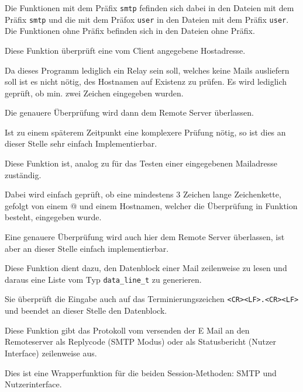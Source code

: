 Die Funktionen mit dem Pr\"{a}fix \texttt{smtp} fefinden sich dabei in den Dateien mit dem Pr\"{a}fix \texttt{smtp} und die mit dem Pr\"{a}fox \texttt{user} in den Dateien mit dem Pr\"{a}fix \texttt{user}.
Die Funktionen ohne Pr\"{a}fix befinden sich in den Dateien ohne Pr\"{a}fix.

\label{fn:check_addr}
Diese Funktion \"{u}berpr\"{u}ft eine vom Client angegebene Hostadresse. 

Da dieses Programm lediglich ein Relay sein soll, welches keine Mails ausliefern soll ist es nicht n\"{o}tig, des Hostnamen auf Existenz zu pr\"{u}fen. Es wird lediglich gepr\"{u}ft, ob min. zwei Zeichen eingegeben wurden. 

Die genauere \"{U}berpr\"{u}fung wird dann dem Remote Server \"{u}berlassen.

Ist zu einem sp\"{a}terem Zeitpunkt eine komplexere Pr\"{u}fung n\"{o}tig, so ist dies an dieser Stelle sehr einfach Implementierbar.

\label{fn:check_mail}
Diese Funktion ist, analog zu  f\"{u}r das Testen einer eingegebenen Mailadresse zust\"{a}ndig. 

Dabei wird einfach gepr\"{u}ft, ob eine mindestens 3 Zeichen lange Zeichenkette, gefolgt von einem @ und einem Hostnamen, welcher die \"{U}berpr\"{u}fung in Funktion  besteht, eingegeben wurde.

Eine genauere \"{U}berpr\"{u}fung wird auch hier dem Remote Server \"{u}berlassen, ist aber an dieser Stelle einfach implementierbar.

\label{fn:read_data}
Diese Funktion dient dazu, den Datenblock einer Mail zeilenweise zu lesen und daraus eine Liste vom Typ \texttt{data\_line\_t} zu generieren.

Sie \"{u}berpr\"{u}ft die Eingabe auch auf das Terminierungszeichen \texttt{<CR><LF>.<CR><LF>} und beendet an dieser Stelle den Datenblock.

\label{fn:put_forward_proto}
Diese Funktion gibt das Protokoll vom versenden der E Mail an den Remoteserver als Replycode (SMTP Modus) oder als Statusbericht (Nutzer Interface) zeilenweise aus.

\label{fn:start_session}
Dies ist eine Wrapperfunktion f\"{u}r die beiden Session-Methoden: SMTP und Nutzerinterface.

